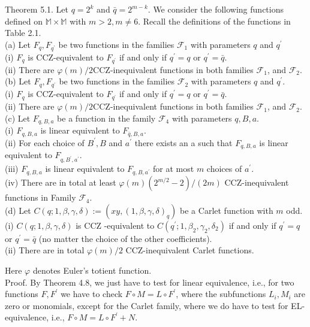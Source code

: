 \documentclass[10pt]{article}
\begin{document}
Theorem 5.1. Let $q=2^{k}$ and $\bar{q}=2^{m-k}$. We consider the following functions defined on $\mathbb{M} \times \mathbb{M}$ with $m>2, m \neq 6$. Recall the definitions of the functions in Table 2.1.\\
(a) Let $F_{q}, F_{q^{\prime}}$ be two functions in the families $\mathcal{F}_{1}$ with parameters $q$ and $q^{\prime}$\\
(i) $F_{q}$ is CCZ-equivalent to $F_{q^{\prime}}$ if and only if $q^{\prime}=q$ or $q^{\prime}=\bar{q}$.\\
(ii) There are $\varphi(m) / 2 \mathrm{CCZ}$-inequivalent functions in both families $\mathcal{F}_{1}$, and $\mathcal{F}_{2}$.\\
(b) Let $F_{q}, F_{q^{\prime}}$ be two functions in the families $\mathcal{F}_{2}$ with parameters $q$ and $q^{\prime}$.\\
(i) $F_{q}$ is CCZ-equivalent to $F_{q^{\prime}}$ if and only if $q^{\prime}=q$ or $q^{\prime}=\bar{q}$.\\
(ii) There are $\varphi(m) / 2 \mathrm{CCZ}$-inequivalent functions in both families $\mathcal{F}_{1}$, and $\mathcal{F}_{2}$.\\
(c) Let $F_{q, B, a}$ be a function in the family $\mathcal{F}_{4}$ with parameters $q, B, a$.\\
(i) $F_{q, B, a}$ is linear equivalent to $F_{\bar{q}, B, a}$.\\
(ii) For each choice of $B^{\prime}, B$ and $a^{\prime}$ there exists an a such that $F_{q, B, a}$ is linear equivalent to $F_{q, B^{\prime}, a^{\prime}}$.\\
(iii) $F_{q, B, a}$ is linear equivalent to $F_{q, B, a^{\prime}}$ for at most $m$ choices of $a^{\prime}$.\\
(iv) There are in total at least $\varphi(m)\left(2^{m / 2}-2\right) /(2 m)$ CCZ-inequivalent functions in Family $\mathcal{F}_{4}$.\\
(d) Let $C(q ; 1, \beta, \gamma, \delta):=\left(x y,(1, \beta, \gamma, \delta)_{q}\right)$ be a Carlet function with $m$ odd.\\
(i) $C(q ; 1, \beta, \gamma, \delta)$ is CCZ -equivalent to $C\left(q^{\prime} ; 1, \beta_{2}, \gamma_{2}, \delta_{2}\right)$ if and only if $q^{\prime}=q$ or $q^{\prime}=\bar{q}$ (no matter the choice of the other coefficients).\\
(ii) There are in total $\varphi(m) / 2$ CCZ-inequivalent Carlet functions.

Here $\varphi$ denotes Euler's totient function.\\
Proof. By Theorem 4.8, we just have to test for linear equivalence, i.e., for two functions $F, F^{\prime}$ we have to check $F \circ M=L \circ F^{\prime}$, where the subfunctions $L_{i}, M_{i}$ are zero or monomials, except for the Carlet family, where we do have to test for EL-equivalence, i.e., $F \circ M=L \circ F^{\prime}+N$.
\end{document}
